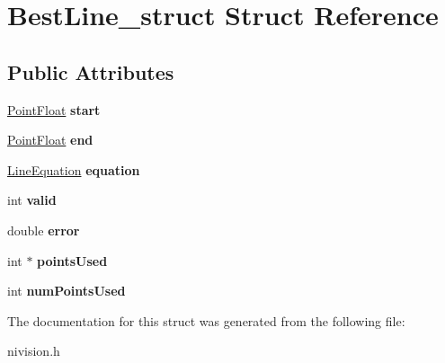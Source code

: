 \hypertarget{structBestLine__struct}{\section{\-Best\-Line\-\_\-struct \-Struct \-Reference}
\label{structBestLine__struct}
}
\subsection*{\-Public \-Attributes}
\begin{DoxyCompactItemize}
\item 
\hypertarget{structBestLine__struct_a73354bc6823e1751d18f6b722e196100}{\hyperlink{structPointFloat__struct}{\-Point\-Float} {\bfseries start}}\label{structBestLine__struct_a73354bc6823e1751d18f6b722e196100}

\item 
\hypertarget{structBestLine__struct_ad83b221a39020a4c9f4cc50b9b604e21}{\hyperlink{structPointFloat__struct}{\-Point\-Float} {\bfseries end}}\label{structBestLine__struct_ad83b221a39020a4c9f4cc50b9b604e21}

\item 
\hypertarget{structBestLine__struct_a64da6085029db5a6b3be4f7d74a37aaa}{\hyperlink{structLineEquation__struct}{\-Line\-Equation} {\bfseries equation}}\label{structBestLine__struct_a64da6085029db5a6b3be4f7d74a37aaa}

\item 
\hypertarget{structBestLine__struct_a6eee4522fc87ef074f12c3ce92780e71}{int {\bfseries valid}}\label{structBestLine__struct_a6eee4522fc87ef074f12c3ce92780e71}

\item 
\hypertarget{structBestLine__struct_ab6021463d6f99397edf29ead4495d93a}{double {\bfseries error}}\label{structBestLine__struct_ab6021463d6f99397edf29ead4495d93a}

\item 
\hypertarget{structBestLine__struct_a564b4aa1e1cc1dc7363728bbdbd0bbc0}{int $\ast$ {\bfseries points\-Used}}\label{structBestLine__struct_a564b4aa1e1cc1dc7363728bbdbd0bbc0}

\item 
\hypertarget{structBestLine__struct_ad50ae4e1a4a16021f5945eb3a1597cc5}{int {\bfseries num\-Points\-Used}}\label{structBestLine__struct_ad50ae4e1a4a16021f5945eb3a1597cc5}

\end{DoxyCompactItemize}


\-The documentation for this struct was generated from the following file\-:\begin{DoxyCompactItemize}
\item 
nivision.\-h\end{DoxyCompactItemize}

